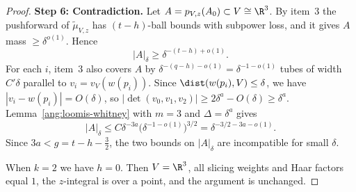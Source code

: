 \begin{proof}
\textbf{Step 6: Contradiction.} Let $A=p_{V,z}(A_0)\subset V\cong\R^3$. By item~3 the pushforward of $\widetilde\mu_{V,z}$ has $(t-h)$-ball bounds with subpower loss, and it gives $A$ mass $\ge\delta^{o(1)}$. Hence
\[
|A|_\delta\ge\delta^{-(t-h)+o(1)}.
\]
For each $i$, item~3 also covers $A$ by $\delta^{-(q-h)-o(1)}=\delta^{-1-o(1)}$ tubes of width $C'\delta$ parallel to $v_i=v_V(w(p_i))$. Since $\dist(w(p_i),V)\le\delta$, we have $|v_i-w(p_i)|=O(\delta)$, so $|\det(v_0,v_1,v_2)|\ge2\delta^a-O(\delta)\ge\delta^a$. Lemma~\ref{ang:loomis-whitney} with $m=3$ and $\Delta=\delta^a$ gives
\[
|A|_\delta\le C\delta^{-3a}\big(\delta^{-1-o(1)}\big)^{3/2}=\delta^{-3/2-3a-o(1)} .
\]
Since $3a<g=t-h-\tfrac32$, the two bounds on $|A|_\delta$ are incompatible for small $\delta$.

When $k=2$ we have $h=0$. Then $V=\R^3$, all slicing weights and Haar factors equal $1$, the $z$-integral is over a point, and the argument is unchanged.
\end{proof}
